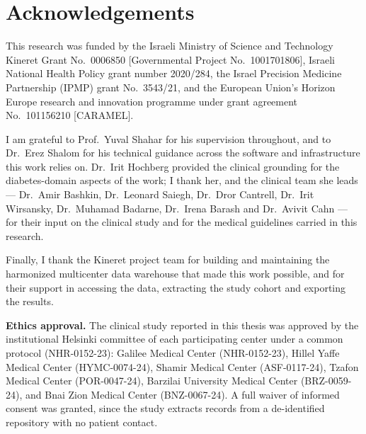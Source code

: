 \chapter*{Acknowledgements}

This research was funded by the Israeli Ministry of Science and
Technology Kineret Grant No.~0006850 [Governmental Project
No.~1001701806], Israeli National Health Policy grant number
2020/284, the Israel Precision Medicine Partnership (IPMP) grant
No.~3543/21, and the European Union's Horizon Europe research and
innovation programme under grant agreement No.~101156210 [CARAMEL].

I am grateful to Prof.~Yuval Shahar for his supervision throughout,
and to Dr.~Erez Shalom for his technical guidance across the
software and infrastructure this work relies on. Dr.~Irit Hochberg
provided the clinical grounding for the diabetes-domain aspects of
the work; I thank her, and the clinical team she leads --- Dr.~Amir
Bashkin, Dr.~Leonard Saiegh, Dr.~Dror Cantrell, Dr.~Irit Wirsansky,
Dr.~Muhamad Badarne, Dr.~Irena Barash and Dr.~Avivit Cahn --- for
their input on the clinical study and for the medical guidelines carried in this research.

Finally, I thank the Kineret project team for building and maintaining
the harmonized multicenter data warehouse that made this work possible,
and for their support in accessing the data, extracting the study
cohort and exporting the results.

\vspace{1.5em}
\noindent\textbf{Ethics approval.}\quad
The clinical study reported in this thesis was approved by the institutional
Helsinki committee of each participating center under a common protocol
(NHR-0152-23): Galilee Medical Center (NHR-0152-23), Hillel Yaffe Medical
Center (HYMC-0074-24), Shamir Medical Center (ASF-0117-24), Tzafon
Medical Center (POR-0047-24), Barzilai University Medical Center
(BRZ-0059-24), and Bnai Zion Medical Center (BNZ-0067-24). A full waiver
of informed consent was granted, since the study extracts records from
a de-identified repository with no patient contact.
